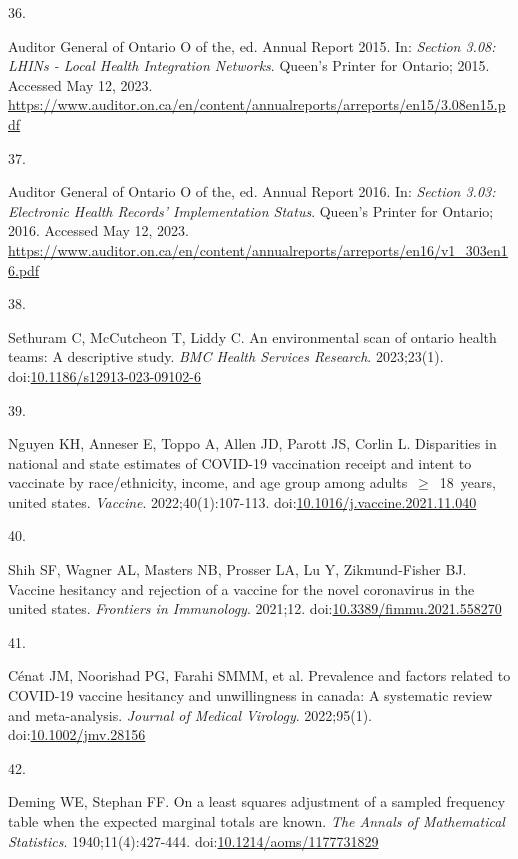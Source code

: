 \documentclass[
]{article}
\newlength{\cslhangindent}
\newlength{\csllabelwidth}
\newlength{\cslentryspacingunit} %
\newenvironment{CSLReferences}[2] %
 {%
  \setlength{\parindent}{0pt}
  \ifodd #1
  \let\oldpar\par
  \def\par{\hangindent=\cslhangindent\oldpar}
  \fi
  \setlength{\parskip}{#2\cslentryspacingunit}
 }%
 {}
\newcommand{\CSLLeftMargin}[1]{\parbox[t]{\csllabelwidth}{#1}}
\newcommand{\CSLRightInline}[1]{\parbox[t]{\linewidth - \csllabelwidth}{#1}\break}
\begin{document}
\begin{CSLReferences}{0}{0}
\leavevmode{}%
\CSLLeftMargin{36. }%
\CSLRightInline{Auditor General of Ontario O of the, ed. Annual {R}eport
2015. In: \emph{Section 3.08: LHINs - Local Health Integration
Networks}. Queen's Printer for Ontario; 2015. Accessed May 12, 2023.
\url{https://www.auditor.on.ca/en/content/annualreports/arreports/en15/3.08en15.pdf}}

\leavevmode{}%
\CSLLeftMargin{37. }%
\CSLRightInline{Auditor General of Ontario O of the, ed. Annual {R}eport
2016. In: \emph{Section 3.03: Electronic Health Records' Implementation
Status}. Queen's Printer for Ontario; 2016. Accessed May 12, 2023.
\url{https://www.auditor.on.ca/en/content/annualreports/arreports/en16/v1_303en16.pdf}}

\leavevmode{}%
\CSLLeftMargin{38. }%
\CSLRightInline{Sethuram C, McCutcheon T, Liddy C. An environmental scan
of ontario health teams: A descriptive study. \emph{{BMC} Health
Services Research}. 2023;23(1).
doi:\href{https://doi.org/10.1186/s12913-023-09102-6}{10.1186/s12913-023-09102-6}}

\leavevmode{}%
\CSLLeftMargin{39. }%
\CSLRightInline{Nguyen KH, Anneser E, Toppo A, Allen JD, Parott JS,
Corlin L. Disparities in national and state estimates of {COVID}-19
vaccination receipt and intent to vaccinate by race/ethnicity, income,
and age group among adults~\(\geq\)~18~years, united states.
\emph{Vaccine}. 2022;40(1):107-113.
doi:\href{https://doi.org/10.1016/j.vaccine.2021.11.040}{10.1016/j.vaccine.2021.11.040}}

\leavevmode{}%
\CSLLeftMargin{40. }%
\CSLRightInline{Shih SF, Wagner AL, Masters NB, Prosser LA, Lu Y,
Zikmund-Fisher BJ. Vaccine hesitancy and rejection of a vaccine for the
novel coronavirus in the united states. \emph{Frontiers in Immunology}.
2021;12.
doi:\href{https://doi.org/10.3389/fimmu.2021.558270}{10.3389/fimmu.2021.558270}}

\leavevmode{}%
\CSLLeftMargin{41. }%
\CSLRightInline{Cénat JM, Noorishad PG, Farahi SMMM, et al. Prevalence
and factors related to {COVID}-19 vaccine hesitancy and unwillingness in
canada: A systematic review and meta-analysis. \emph{Journal of Medical
Virology}. 2022;95(1).
doi:\href{https://doi.org/10.1002/jmv.28156}{10.1002/jmv.28156}}

\leavevmode{}%
\CSLLeftMargin{42. }%
\CSLRightInline{Deming WE, Stephan FF. On a least squares adjustment of
a sampled frequency table when the expected marginal totals are known.
\emph{The Annals of Mathematical Statistics}. 1940;11(4):427-444.
doi:\href{https://doi.org/10.1214/aoms/1177731829}{10.1214/aoms/1177731829}}


\end{CSLReferences}
\end{document}
